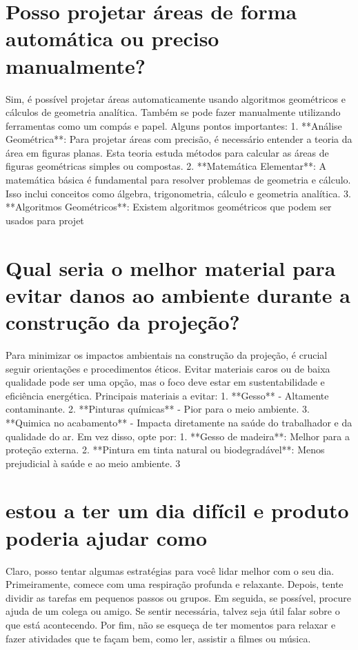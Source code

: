 \documentclass[11pt,a4paper]{article}
\begin{document}
\section{Posso projetar áreas de forma automática ou preciso manualmente?}
Sim, é possível projetar áreas automaticamente usando algoritmos geométricos e cálculos de geometria analítica. Também se pode fazer manualmente utilizando ferramentas como um compás e papel. Alguns pontos importantes: 1. **Análise Geométrica**: Para projetar áreas com precisão, é necessário entender a teoria da área em figuras planas. Esta teoria estuda métodos para calcular as áreas de figuras geométricas simples ou compostas. 2. **Matemática Elementar**: A matemática básica é fundamental para resolver problemas de geometria e cálculo. Isso inclui conceitos como álgebra, trigonometria, cálculo e geometria analítica. 3. **Algoritmos Geométricos**: Existem algoritmos geométricos que podem ser usados para projet

\section{Qual seria o melhor material para evitar danos ao ambiente durante a construção da projeção?}
Para minimizar os impactos ambientais na construção da projeção, é crucial seguir orientações e procedimentos éticos. Evitar materiais caros ou de baixa qualidade pode ser uma opção, mas o foco deve estar em sustentabilidade e eficiência energética. Principais materiais a evitar: 1. **Gesso** - Altamente contaminante. 2. **Pinturas químicas** - Pior para o meio ambiente. 3. **Quimica no acabamento** - Impacta diretamente na saúde do trabalhador e da qualidade do ar. Em vez disso, opte por: 1. **Gesso de madeira**: Melhor para a proteção externa. 2. **Pintura em tinta natural ou biodegradável**: Menos prejudicial à saúde e ao meio ambiente. 3

\section{estou a ter um dia difícil e produto poderia ajudar como}
Claro, posso tentar algumas estratégias para você lidar melhor com o seu dia. Primeiramente, comece com uma respiração profunda e relaxante. Depois, tente dividir as tarefas em pequenos passos ou grupos. Em seguida, se possível, procure ajuda de um colega ou amigo. Se sentir necessária, talvez seja útil falar sobre o que está acontecendo. Por fim, não se esqueça de ter momentos para relaxar e fazer atividades que te façam bem, como ler, assistir a filmes ou música.
\end{document}
